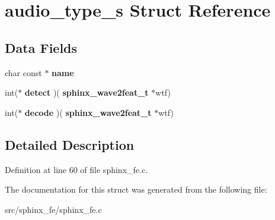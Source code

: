 \section{audio\+\_\+type\+\_\+s Struct Reference}
\label{structaudio__type__s}
\subsection*{Data Fields}
\begin{DoxyCompactItemize}
\item 
\mbox{\label{structaudio__type__s_a5fa19a5507e0c89c1f3113813ffd6442}} 
char const  $\ast$ {\bfseries name}
\item 
\mbox{\label{structaudio__type__s_a02d2a7d109e63a8447a81fcb1e502ba0}} 
int($\ast$ {\bfseries detect} )(\textbf{ sphinx\+\_\+wave2feat\+\_\+t} $\ast$wtf)
\item 
\mbox{\label{structaudio__type__s_ab99854b93f63f4e97d3fc59e1d1bae2d}} 
int($\ast$ {\bfseries decode} )(\textbf{ sphinx\+\_\+wave2feat\+\_\+t} $\ast$wtf)
\end{DoxyCompactItemize}


\subsection{Detailed Description}


Definition at line 60 of file sphinx\+\_\+fe.\+c.



The documentation for this struct was generated from the following file\+:\begin{DoxyCompactItemize}
\item 
src/sphinx\+\_\+fe/sphinx\+\_\+fe.\+c\end{DoxyCompactItemize}
